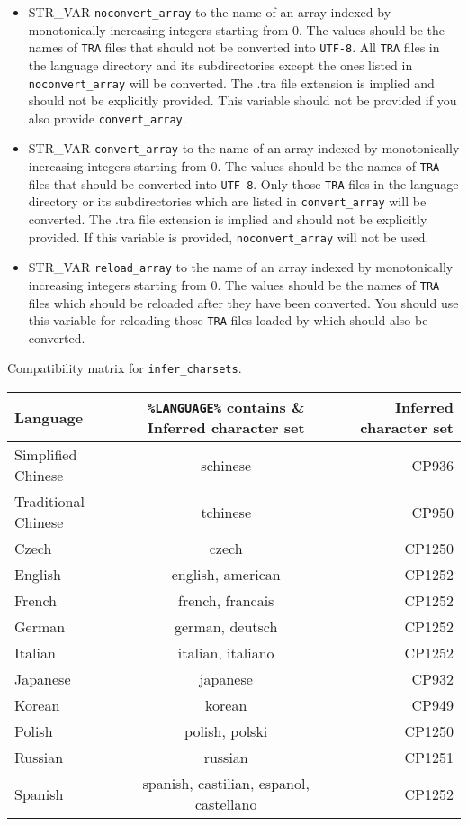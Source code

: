 \documentclass{article}
\def\ttref#1{\ahrefloc{#1}{\tt #1}}
\def\t#1{{\tt #1}}
\begin{document}
\begin{itemize}
\item STR_VAR \verb+noconvert_array+ to the name of an array indexed by monotonically increasing integers starting from 0. The values should be the names of \t{TRA} files that should not be converted into \t{UTF-8}. All \t{TRA} files in the language directory and its subdirectories except the ones listed in \verb+noconvert_array+ will be converted. The .tra file extension is implied and should not be explicitly provided. This variable should not be provided if you also provide \verb+convert_array+.
\item STR_VAR \verb+convert_array+ to the name of an array indexed by monotonically increasing integers starting from 0. The values should be the names of \t{TRA} files that should be converted into \t{UTF-8}. Only those \t{TRA} files in the language directory or its subdirectories which are listed in \verb+convert_array+ will be converted. The .tra file extension is implied and should not be explicitly provided. If this variable is provided, \verb+noconvert_array+ will not be used.
\item STR_VAR \verb+reload_array+ to the name of an array indexed by monotonically increasing integers starting from 0. The values should be the names of \t{TRA} files which should be reloaded after they have been converted. You should use this variable for reloading those \t{TRA} files loaded by \ttref{LANGUAGE} which should also be converted.
\end{itemize}

Compatibility matrix for \verb+infer_charsets+.
\begin{tabular} {l c r}
\hline
Language & \verb+%LANGUAGE%+ contains & Inferred character set \\
\hline
Simplified Chinese & schinese & CP936 \\
Traditional Chinese & tchinese & CP950 \\
Czech & czech & CP1250 \\
English & english, american & CP1252 \\
French & french, francais & CP1252 \\
German & german, deutsch & CP1252 \\
Italian & italian, italiano & CP1252 \\
Japanese & japanese & CP932 \\
Korean & korean & CP949 \\
Polish & polish, polski & CP1250 \\
Russian & russian & CP1251 \\
Spanish & spanish, castilian, espanol, castellano & CP1252 \\
\hline
\end{tabular}
\\
\end{document}
